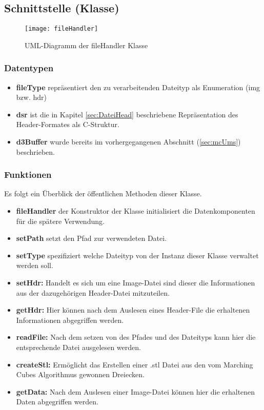 \subsection{Schnittstelle (Klasse)}
\begin{figure}
	\centering
	\texttt{[image: fileHandler]}
	\caption{UML-Diagramm der fileHandler Klasse}
	\label{fig:fileHandler}
\end{figure}
\subsubsection{Datentypen}
\begin{itemize}
	\item \textbf{fileType} repräsentiert den zu verarbeitenden Dateityp als Enumeration (img bzw. hdr) 
	\item \textbf{dsr} ist die in Kapitel \ref{sec:DateiHead} beschriebene Repräsentation des Header-Formates als C-Struktur.
	\item \textbf{d3Buffer} wurde bereits im vorhergegangenen Abschnitt (\ref{sec:mcUms}) beschrieben.
\end{itemize}
\subsubsection{Funktionen}
Es folgt ein Überblick der öffentlichen Methoden dieser Klasse.\\
\begin{itemize}
	\item \textbf{fileHandler} der Konstruktor der Klasse initialisiert die Datenkomponenten für die spätere Verwendung.
	\item \textbf{setPath} setzt den Pfad zur verwendeten Datei.
	\item \textbf{setType} spezifiziert welche Dateityp von der Instanz dieser Klasse verwaltet werden soll.
	\item \textbf{setHdr:} Handelt es sich um eine Image-Datei sind dieser die Informationen aus der dazugehörigen Header-Datei mitzuteilen. 
	\item \textbf{getHdr:} Hier können nach dem Auslesen eines Header-File die erhaltenen Informationen abgegriffen werden. 
	\item \textbf{readFile:} Nach dem setzen von des Pfades und des Dateityps kann hier die entsprechende Datei ausgelesen werden.
	\item \textbf{createStl:} Ermöglicht das Erstellen einer .stl Datei aus den vom Marching Cubes Algorithmus gewonnen Dreiecken. 
	\item \textbf{getData:} Nach dem Auslesen einer Image-Datei können hier die erhaltenen Daten abgegriffen werden.
\end{itemize}
